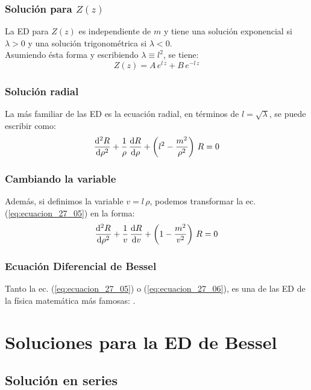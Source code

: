 \documentclass[12pt]{beamer}
\begin{document}
\begin{frame}
\frametitle{Solución para $Z (z)$}
La ED para $Z (z)$ es independiente de $m$ \pause y tiene una solución exponencial si $\lambda > 0$ y una solución trigonométrica si $\lambda < 0$.
\\
\bigskip
\pause
Asumiendo ésta forma y escribiendo $\lambda \equiv l^{2}$, se tiene:
\pause
\begin{equation}
Z (z) = A \, e^{l \, z} + B \, e^{- l \, z}
\label{eq:ecuacion_27_04}
\end{equation}
\end{frame}
\begin{frame}
\frametitle{Solución radial}
La más familiar de las ED es la ecuación radial, \pause en términos de $l = \sqrt{\lambda}$, se puede escribir como:
\pause
\begin{equation}
\dv[2]{R}{\rho} + \dfrac{1}{\rho} \, \dv{R}{\rho} + \left( l^{2} - \dfrac{m^{2}}{\rho^{2}} \right) \, R = 0
\label{eq:ecuacion_27_05}
\end{equation}
\end{frame}
\begin{frame}
\frametitle{Cambiando la variable}
Además, si definimos la variable $v = l\, \rho$, podemos transformar la ec. (\ref{eq:ecuacion_27_05}) en la forma:
\pause
\begin{equation}
\dv[2]{R}{\rho} + \dfrac{1}{v} \, \dv{R}{v} + \left( 1 - \dfrac{m^{2}}{v^{2}} \right) \, R = 0
\label{eq:ecuacion_27_06}
\end{equation}
\end{frame}
\begin{frame}
\frametitle{Ecuación Diferencial de Bessel}
Tanto la ec. (\ref{eq:ecuacion_27_05}) o (\ref{eq:ecuacion_27_06}), es una de las ED de la física matemática más famosas: .
\end{frame}

\section{Soluciones para la ED de Bessel}
\subsection{Solución en series}
\end{document}
